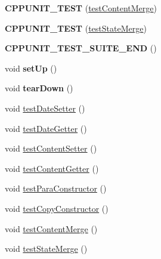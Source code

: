 \begin{DoxyCompactItemize}
\item 
\hypertarget{classFixtureState_a0158583e0e3ea8facc087e6b19ecc709}{{\bfseries C\-P\-P\-U\-N\-I\-T\-\_\-\-T\-E\-S\-T} (\hyperlink{classFixtureState_a74e4df88858f1d5cae700eb0b891d790}{test\-Content\-Merge})}\label{classFixtureState_a0158583e0e3ea8facc087e6b19ecc709}

\item 
\hypertarget{classFixtureState_af28e12e2f700210a55600ec386308a43}{{\bfseries C\-P\-P\-U\-N\-I\-T\-\_\-\-T\-E\-S\-T} (\hyperlink{classFixtureState_aca99d95e2e771d5a7f89de3d247576da}{test\-State\-Merge})}\label{classFixtureState_af28e12e2f700210a55600ec386308a43}

\item 
\hypertarget{classFixtureState_a9262f63cbc9b4b88cce1a51938f893ab}{{\bfseries C\-P\-P\-U\-N\-I\-T\-\_\-\-T\-E\-S\-T\-\_\-\-S\-U\-I\-T\-E\-\_\-\-E\-N\-D} ()}\label{classFixtureState_a9262f63cbc9b4b88cce1a51938f893ab}

\item 
\hypertarget{classFixtureState_a14721f818a412449fb768a06ecd441f9}{void {\bfseries set\-Up} ()}\label{classFixtureState_a14721f818a412449fb768a06ecd441f9}

\item 
\hypertarget{classFixtureState_adfde2705e5fed8ca1ec95e670c07cf42}{void {\bfseries tear\-Down} ()}\label{classFixtureState_adfde2705e5fed8ca1ec95e670c07cf42}

\item 
void \hyperlink{classFixtureState_a78b6da6dc98770d6ba888c505abfbe75}{test\-Date\-Setter} ()
\item 
void \hyperlink{classFixtureState_adebc4786a79503e8043e7656b685553d}{test\-Date\-Getter} ()
\item 
void \hyperlink{classFixtureState_ade2b801626053e1a466932100385728a}{test\-Content\-Setter} ()
\item 
void \hyperlink{classFixtureState_a483306b02bf3727eda3cbc852e2bf782}{test\-Content\-Getter} ()
\item 
void \hyperlink{classFixtureState_a9ef71fada62e876202304729bd936f25}{test\-Para\-Constructor} ()
\item 
void \hyperlink{classFixtureState_aad72e91e1c12f29e9a272e06ee9c8bec}{test\-Copy\-Constructor} ()
\item 
void \hyperlink{classFixtureState_a74e4df88858f1d5cae700eb0b891d790}{test\-Content\-Merge} ()
\item 
void \hyperlink{classFixtureState_aca99d95e2e771d5a7f89de3d247576da}{test\-State\-Merge} ()
\end{DoxyCompactItemize}
